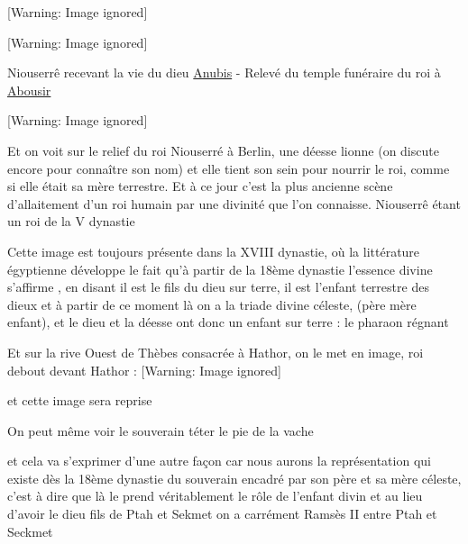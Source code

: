 \documentclass[a4paper,10pt]{article}
\begin{document}
  [Warning: Image ignored] %
 

  [Warning: Image ignored] %
 

Niouserrê recevant la vie du dieu
\href{http://fr.wikipedia.org/wiki/Anubis}{\textcolor[rgb]{0.0,0.21960784,0.62352943}{Anubis}}
- Relevé du temple funéraire du roi à
\href{http://fr.wikipedia.org/wiki/Abousir}{\textcolor[rgb]{0.0,0.21960784,0.62352943}{Abousir}}

  [Warning: Image ignored] %
 

Et on voit  sur le relief du roi Niouserré à Berlin, une déesse lionne
(on discute encore pour connaître son nom) et elle tient son sein pour
nourrir le roi, comme si elle était sa mère terrestre. Et  à ce jour
c'est la plus ancienne scène
d'allaitement d'un roi humain par une
divinité que l'on connaisse. Niouserrê étant un roi de
la V dynastie

Cette image est toujours présente dans la XVIII dynastie, où la
littérature égyptienne développe le fait qu'à partir
de la 18ème dynastie l'essence divine
s'affirme , en disant {\textquotedbl} il est le fils
du dieu sur terre, il est l'enfant terrestre des dieux
et  à partir de ce moment là on a la triade divine céleste, (père mère
enfant),  et le dieu et la déesse ont donc un enfant sur terre : le
pharaon régnant

Et sur la rive Ouest de Thèbes consacrée à Hathor,  on le met en image,
roi debout devant Hathor :  [Warning: Image ignored]
 

 et cette image sera reprise

On peut même voir le souverain téter le pie de la vache

et cela va s'exprimer d'une autre
façon car nous aurons la représentation qui existe dès la 18ème
dynastie du souverain encadré par son père et sa mère céleste,
c'est à dire que là le prend véritablement le rôle de
l'enfant divin et au lieu d'avoir le
dieu fils de Ptah et Sekmet on a carrément Ramsès II entre Ptah et
Seckmet
\end{document}
